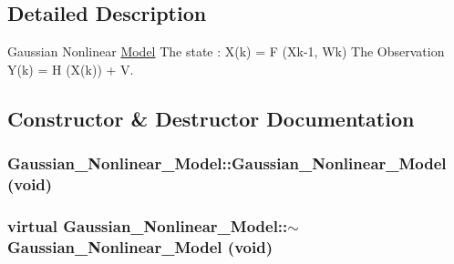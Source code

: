\subsection{Detailed Description}
Gaussian Nonlinear \hyperlink{class_model}{Model} The state : X(k) = F (Xk-1, Wk) The Observation Y(k) = H (X(k)) + V. 

\subsection{Constructor \& Destructor Documentation}
\hypertarget{class_gaussian___nonlinear___model_59d94561c9b95d4b510f244a198c29a0}{
\subsubsection[{Gaussian\_\-Nonlinear\_\-Model}]{\setlength{\rightskip}{0pt plus 5cm}Gaussian\_\-Nonlinear\_\-Model::Gaussian\_\-Nonlinear\_\-Model (void)}}
\label{class_gaussian___nonlinear___model_59d94561c9b95d4b510f244a198c29a0}


\hypertarget{class_gaussian___nonlinear___model_35fe0f1156e0d0e687937df527aea1e0}{
\subsubsection[{$\sim$Gaussian\_\-Nonlinear\_\-Model}]{\setlength{\rightskip}{0pt plus 5cm}virtual Gaussian\_\-Nonlinear\_\-Model::$\sim$Gaussian\_\-Nonlinear\_\-Model (void)}}
\label{class_gaussian___nonlinear___model_35fe0f1156e0d0e687937df527aea1e0}




